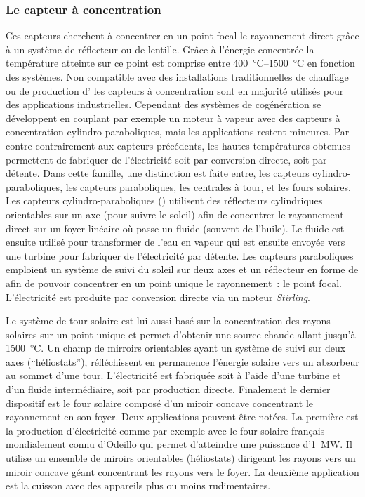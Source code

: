 \subsubsection{Le capteur à concentration} %
\label{ssub:le_capteur_a_concentration}
Ces capteurs cherchent à concentrer en un point focal le rayonnement direct grâce à un
système de réflecteur ou de lentille. Grâce à l’énergie concentrée la température
atteinte sur ce point est comprise entre \SIrange{400}{1500}{\celsius} en fonction des
systèmes. Non compatible avec des installations traditionnelles de chauffage ou de production
d’ les capteurs à concentration sont en majorité utilisés pour des applications
industrielles. Cependant des systèmes de cogénération se développent en couplant
par exemple un moteur à vapeur avec des capteurs à concentration cylindro-paraboliques,
mais les applications restent mineures.
Par contre contrairement aux capteurs précédents, les hautes températures obtenues
permettent de fabriquer de l’électricité soit par conversion directe, soit par détente.
Dans cette famille, une distinction est faite entre, les capteurs cylindro-paraboliques, les capteurs
paraboliques, les centrales à tour, et les fours solaires. Les capteurs cylindro-paraboliques
() utilisent des réflecteurs
cylindriques orientables sur un axe (pour suivre le soleil) afin de concentrer le
rayonnement direct sur un foyer linéaire où passe un fluide (souvent de l’huile). Le fluide
est ensuite utilisé pour transformer de l’eau en vapeur qui est ensuite envoyée vers une turbine pour fabriquer de l’électricité par détente.
Les capteurs paraboliques emploient un système de suivi du soleil sur deux axes et un
réflecteur en forme de  afin de pouvoir concentrer en un point unique le rayonnement~: le point focal.
L’électricité est produite par conversion directe via un moteur \textit{Stirling}.

Le système de tour solaire est lui aussi basé sur la concentration des rayons solaires sur
un point unique et permet d’obtenir une source chaude allant jusqu’à
\SI{1500}{\celsius}. Un champ de mirroirs orientables ayant un système de suivi sur deux axes
(\enquote{héliostats}), réfléchissent en permanence l’énergie solaire vers un absorbeur au
sommet d’une tour.
L’électricité est fabriquée soit à l’aide d’une turbine et d’un fluide intermédiaire, soit par
production directe. Finalement le dernier dispositif est le four solaire composé d’un
miroir concave concentrant le rayonnement en son foyer. Deux applications peuvent être
notées. La première est la production d’électricité comme par exemple avec le four solaire
français mondialement connu d’\href{http://www.promes.cnrs.fr/index.php?page=historique}{Odeillo} qui permet
d’atteindre une puissance d’\SI{1}{\mega\watt}. Il utilise un ensemble de miroirs
orientables (héliostats) dirigeant les rayons vers un miroir concave géant concentrant les
rayons vers le foyer. La deuxième application est la cuisson avec des appareils plus ou
moins rudimentaires.



